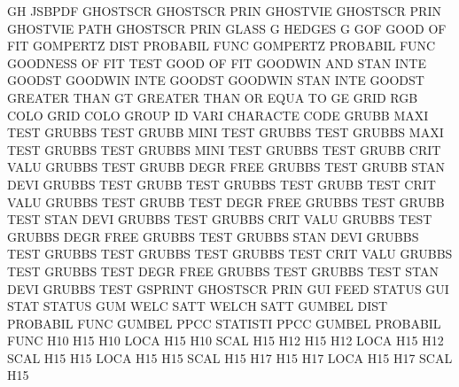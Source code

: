 GH                                      JSBPDF
GHOSTSCR                                GHOSTSCR PRIN
GHOSTVIE                                GHOSTSCR PRIN
GHOSTVIE PATH                           GHOSTSCR PRIN
GLASS    G                              HEDGES   G
GOF                                     GOOD     OF   FIT
GOMPERTZ DIST                           PROBABIL FUNC
GOMPERTZ                                PROBABIL FUNC
GOODNESS OF   FIT  TEST                 GOOD     OF   FIT
GOODWIN  AND  STAN INTE                 GOODST
GOODWIN  INTE                           GOODST
GOODWIN  STAN INTE                      GOODST
GREATER  THAN                           GT
GREATER  THAN OR   EQUA TO              GE
GRID     RGB  COLO                      GRID     COLO
GROUP    ID   VARI                      CHARACTE CODE
GRUBB    MAXI TEST                      GRUBBS   TEST
GRUBB    MINI TEST                      GRUBBS   TEST
GRUBBS   MAXI TEST                      GRUBBS   TEST
GRUBBS   MINI TEST                      GRUBBS   TEST
GRUBB    CRIT VALU                      GRUBBS   TEST
GRUBB    DEGR FREE                      GRUBBS   TEST
GRUBB    STAN DEVI                      GRUBBS   TEST
GRUBB    TEST                           GRUBBS   TEST
GRUBB    TEST CRIT VALU                 GRUBBS   TEST
GRUBB    TEST DEGR FREE                 GRUBBS   TEST
GRUBB    TEST STAN DEVI                 GRUBBS   TEST
GRUBBS   CRIT VALU                      GRUBBS   TEST
GRUBBS   DEGR FREE                      GRUBBS   TEST
GRUBBS   STAN DEVI                      GRUBBS   TEST
GRUBBS   TEST                           GRUBBS   TEST
GRUBBS   TEST CRIT VALU                 GRUBBS   TEST
GRUBBS   TEST DEGR FREE                 GRUBBS   TEST
GRUBBS   TEST STAN DEVI                 GRUBBS   TEST
GSPRINT                                 GHOSTSCR PRIN
GUI      FEED                           STATUS
GUI      STAT                           STATUS
GUM      WELC SATT                      WELCH    SATT
GUMBEL   DIST                           PROBABIL FUNC
GUMBEL   PPCC                           STATISTI PPCC
GUMBEL                                  PROBABIL FUNC
H10                                     H15
H10      LOCA                           H15
H10      SCAL                           H15
H12                                     H15
H12      LOCA                           H15
H12      SCAL                           H15
H15      LOCA                           H15
H15      SCAL                           H15
H17                                     H15
H17      LOCA                           H15
H17      SCAL                           H15
